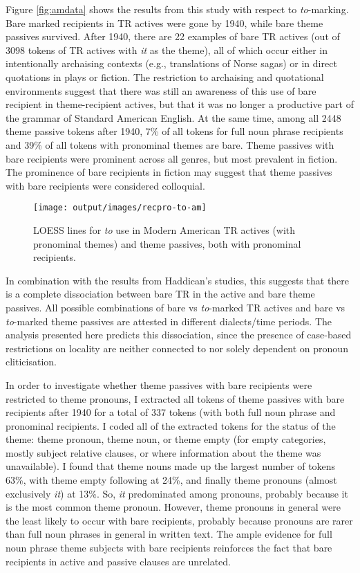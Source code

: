 Figure \ref{fig:amdata} shows the results from this study with respect to \textit{to}-marking. Bare marked recipients in TR actives were gone by 1940, while bare theme passives survived. After 1940, there are 22 examples of bare TR actives (out of 3098 tokens of TR actives with \textit{it} as the theme), all of which occur either in intentionally archaising contexts (e.g., translations of Norse sagas) or in direct quotations in plays or fiction. The restriction to archaising and quotational environments suggest that there was still an awareness of this use of bare recipient in theme-recipient actives, but that it was no longer a productive part of the grammar of Standard American English. At the same time, among all 2448 theme passive tokens after 1940, 7\% of all tokens for full noun phrase recipients and 39\% of all tokens with pronominal themes are bare. Theme passives with bare recipients were prominent across all genres, but most prevalent in fiction. The prominence of bare recipients in fiction may suggest that theme passives with bare recipients were considered colloquial.

\begin{figure}[ht!]

{\centering \texttt{[image: output/images/recpro-to-am]} 

}

\caption{LOESS lines for \textit{to} use in Modern American TR actives (with pronominal themes) and theme passives, both with pronominal recipients.\label{fig:amdata}}\label{fig:amtoset-graph}
\end{figure}

In combination with the results from Haddican's studies, this suggests that there is a complete dissociation between bare TR in the active and bare theme passives. All possible combinations of bare vs \textit{to}-marked TR actives and bare vs \textit{to}-marked theme passives are attested in different dialects/time periods. The analysis presented here predicts this dissociation, since the presence of case-based restrictions on locality are neither connected to nor solely dependent on pronoun cliticisation.

In order to investigate whether theme passives with bare recipients were restricted to theme pronouns, I extracted all tokens of theme passives with bare recipients after 1940 for a total of 337 tokens (with both full noun phrase and pronominal recipients. I coded all of the extracted tokens for the status of the theme: theme pronoun, theme noun, or theme empty (for empty categories, mostly subject relative clauses, or where information about the theme was unavailable). I found that theme nouns made up the largest number of tokens 63\%, with theme empty following at 24\%, and finally theme pronouns (almost exclusively \textit{it}) at 13\%. So, \textit{it} predominated among pronouns, probably because it is the most common theme pronoun. However, theme pronouns in general were the least likely to occur with bare recipients, probably because pronouns are rarer than full noun phrases in general in written text. The ample evidence for full noun phrase theme subjects with bare recipients reinforces the fact that bare recipients in active and passive clauses are unrelated.

